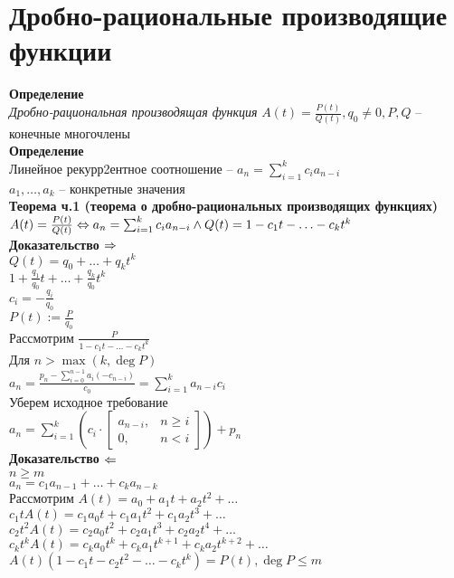 \documentclass[12pt]{article}
\begin{document}
\section{Дробно-рациональные производящие функции}
\textbf{Определение}\\
\textit{Дробно-рациональная производящая функция} $A(t) = \frac{P(t)}{Q(t)}, q_0 \neq 0, P, Q$ -- конечные многочлены\\
\textbf{Определение}\\
Линейное рекурр2ентное соотношение -- $a_n = \sum_{i=1}^k c_ia_{n-i}$\\
$a_1, \ldots, a_k$ -- конкретные значения\\
\textbf{Теорема ч.1 (теорема о дробно-рациональных производящих функциях)}\\
$A(t) = \frac{P(t)}{Q(t)} \Leftrightarrow a_n = \sum_{i=1}^k c_ia_{n-i} \land Q(t) = 1-c_1t-\ldots - c_kt^k$\\
\textbf{Доказательство $\Rightarrow$}\\
$Q(t) = q_0 + \ldots + q_kt^k$\\
$1 + \frac{q_1}{q_0}t + \ldots + \frac{q_k}{q_0}t^k$\\
$c_i = -\frac{q_i}{q_0}$\\
$P(t) := \frac{P}{q_0}$\\
Рассмотрим $\frac{P}{1-c_1t - \ldots - c_kt^k}$\\
Для $n > \max(k, \deg P)$\\
$a_n = \frac{p_n - \sum_{i=0}^{n-1} a_i(-c_{n-i})}{c_0} = \sum_{i=1}^k a_{n-i}c_i$\\
Уберем исходное требование\\
$a_n = \sum_{i=1}^k (c_i\cdot \left[\begin{array}{cc}
    a_{n-i},& n \geq i\\
    0,& n < i
\end{array}\right]) + p_n$\\
\textbf{Доказательство $\Leftarrow$}\\
$n \geq m$\\
$a_n = c_1a_{n-1} + \ldots + c_ka_{n-k}$\\
Рассмотрим $A(t) = a_0 + a_1t + a_2t^2 + \ldots$\\
$c_1t A(t) = c_1a_0t + c_1a_1t^2 + c_1a_2t^3 + \ldots$\\
$c_2t^2 A(t) = c_2a_0t^2 + c_2a_1t^3 + c_2a_2t^4 + \ldots$\\
$c_kt^k A(t) = c_ka_0t^k + c_ka_1t^{k+1} + c_ka_2t^{k+2} + \ldots$\\
$A(t)(1-c_1t-c_2t^2 - \ldots - c_kt^k) = P(t), \deg P \leq m$\\
\end{document}
